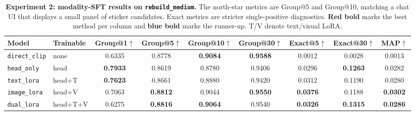 \documentclass[10pt,twocolumn,letterpaper]{article}
\newcommand{\best}[1]{\textcolor{red!75!black}{\textbf{#1}}}
\newcommand{\second}[1]{\textcolor{blue!75!black}{\textbf{#1}}}
\begin{document}
\begin{table}[t]
\setlength{\tabcolsep}{3.5pt}
\centering
\scriptsize
\begin{tabular}{l l c c c c c c c}
\toprule
\textbf{Model} & \textbf{Trainable}
 & \textbf{Group@1}$\uparrow$ & \textbf{Group@5}$\uparrow$
 & \textbf{Group@10}$\uparrow$ & \textbf{Group@30}$\uparrow$
 & \textbf{Exact@5}$\uparrow$ & \textbf{Exact@30}$\uparrow$ & \textbf{MAP}$\uparrow$ \\
\midrule
\texttt{direct\_clip} & none
 & 0.6335 & 0.8778 & \best{0.9084} & \best{0.9588} & 0.0012 & 0.0028 & 0.0013 \\
\texttt{head\_only} & head
 & \best{0.7933} & 0.8619 & 0.8780 & 0.9406 & 0.0296 & \second{0.1263} & 0.0282 \\
\texttt{text\_lora} & head+T
 & \second{0.7623} & 0.8661 & 0.8880 & 0.9420 & 0.0312 & 0.1190 & 0.0280 \\
\texttt{image\_lora} & head+V
 & 0.7063 & \second{0.8812} & 0.9044 & \second{0.9550} & \best{0.0376} & 0.1188 & \best{0.0302} \\
\texttt{dual\_lora} & head+T+V
 & 0.6275 & \best{0.8816} & \second{0.9064} & 0.9540 & \second{0.0326} & \best{0.1315} & \second{0.0286} \\
\bottomrule
\end{tabular}
\caption{\textbf{Experiment 2: modality-SFT results on \texttt{rebuild\_medium}.} The north-star
metrics are Group@5 and Group@10, matching a chat UI that displays a small
panel of sticker candidates. Exact metrics are stricter single-positive
diagnostics. \best{Red bold} marks the best method per column and
\second{blue bold} marks the runner-up. T/V denote text/visual LoRA.}
\label{table:sft-main}
\end{table}
\end{document}
